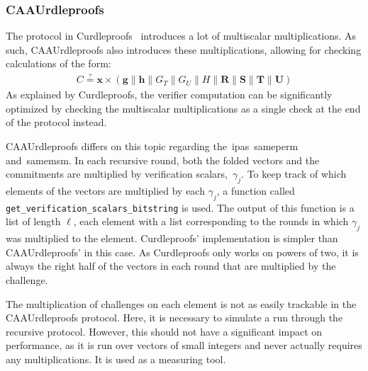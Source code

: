 \subsubsection{CAAUrdleproofs}
The protocol in Curdleproofs~\cite{Curdleproofs} introduces a lot of multiscalar multiplications.
As such, CAAUrdleproofs also introduces these multiplications, allowing for checking calculations of the form:
\begin{align}
    C\stackrel{?}{=}\mathbf{x}\times(\mathbf{g}\|\mathbf{h}\|G_T\|G_U\|H\|\mathbf{R}\|\mathbf{S}\|\mathbf{T}\|\mathbf{U})
\end{align}
As explained by Curdleproofs, the verifier computation can be significantly optimized by checking the multiscalar multiplications as a single check at the end of the protocol instead.

CAAUrdleproofs differs on this topic regarding the~\glspl{ipa}~\gls{sameperm} and~\gls{samemsm}.
In each recursive round, both the folded vectors and the commitments are multiplied by verification scalars,~$\gamma_j$.
To keep track of which elements of the vectors are multiplied by each $\gamma_j$, a function called \texttt{get\_verification\_scalars\_bitstring} is used.
The output of this function is a list of length $\ell$, each element with a list corresponding to the rounds in which $\gamma_j$ was multiplied to the element.
Curdleproofs' implementation is simpler than CAAUrdleproofs' in this case.
As Curdleproofs only works on powers of two, it is always the right half of the vectors in each round that are multiplied by the challenge.

The multiplication of challenges on each element is not as easily trackable in the CAAUrdleproofs protocol.
Here, it is necessary to simulate a run through the recursive protocol.
However, this should not have a significant impact on performance, as it is run over vectors of small integers and never actually requires any multiplications.
It is used as a measuring tool.

